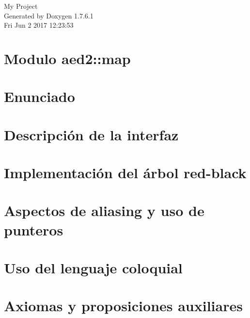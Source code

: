 \documentclass[a4paper]{book}
\begin{document}
\hypersetup{pageanchor=false,citecolor=blue}
\begin{titlepage}
\vspace*{7cm}
\begin{center}
{\Large \-My \-Project }\\
\vspace*{1cm}
{\large \-Generated by Doxygen 1.7.6.1}\\
\vspace*{0.5cm}
{\small Fri Jun 2 2017 12:23:53}\\
\end{center}
\end{titlepage}
\clearemptydoublepage
{}
\tableofcontents
\clearemptydoublepage
{}
\hypersetup{pageanchor=true,citecolor=blue}
\chapter{\-Modulo aed2\-:\-:map}
\label{index}\hypertarget{index}{}
\chapter{\-Enunciado}
\label{Enunciado}
\hypertarget{Enunciado}{}

\chapter{\-Descripción de la interfaz}
\label{Interfaz}
\hypertarget{Interfaz}{}

\chapter{\-Implementación del árbol red-\/black}
\label{Implementacion}
\hypertarget{Implementacion}{}

\chapter{\-Aspectos de aliasing y uso de punteros}
\label{Aliasing}
\hypertarget{Aliasing}{}

\chapter{\-Uso del lenguaje coloquial}
\label{Castellano}
\hypertarget{Castellano}{}

\chapter{\-Axiomas y proposiciones auxiliares}
\label{axiomas}
\hypertarget{axiomas}{}

\end{document}

